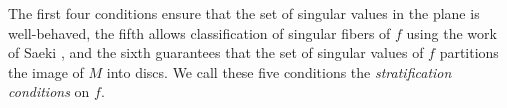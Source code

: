 The first four conditions ensure that the set of singular values in the plane is well-behaved, the fifth allows classification of singular fibers of $f$ using the work of Saeki \cite{Saeki}, and the sixth guarantees that the set of singular values of $f$ partitions the image of $M$ into discs.
We call these five conditions the \emph{stratification conditions} on $f$.